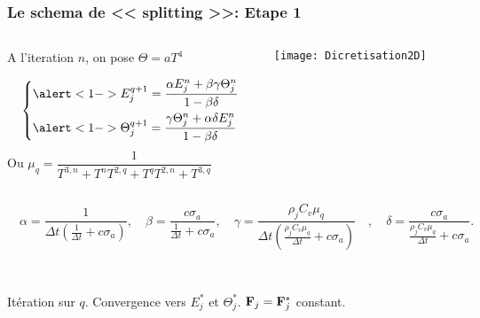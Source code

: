 \begin{frame}
  \frametitle{Le schema de << splitting >>: Etape 1}
  \begin{columns}
    \begin{column}{0.5\textwidth}
     A l'iteration $n$, on pose $\Theta = aT^4$

      \begingroup
      \normalsize
      \begin{equation*} 
        \begin{dcases}
         \alert<1->{E_j^{q+1} = \dfrac{\alpha E_j^n + \beta \gamma \Theta_j^n}{1 - \beta \delta}} \\
         \alert<1->{\Theta_j^{q+1} = \dfrac{\gamma \Theta_j^n + \alpha \delta E_j^n}{1 - \beta \delta}}
        \end{dcases}
    \label{eqn:Step1}
    \end{equation*}
      \endgroup
      Ou
      \tiny
      $\mu_q = \dfrac{1}{T^{3,n} + T^{n}T^{2,q} + T^{q}T^{2,n} + T^{3,q}}$
      \normalsize
    \end{column}
    \begin{column}{0.5\textwidth}
       \begin{center}
        \texttt{[image: Dicretisation2D]}       
       \end{center}
    \end{column}
   \end{columns}
   \tiny
  $\quad  \alpha = \dfrac{1}{\Delta t \left( \frac{1}{\Delta t} + c \sigma_a \right)} ,\quad 
   \beta = \dfrac{c \sigma_a}{\frac{1}{\Delta t} + c \sigma_a} ,\quad 
   \gamma = \dfrac{\rho_j C_v \mu_q}{\Delta t \left( \frac{\rho_j C_v \mu_q}{\Delta t} + c \sigma_a \right)} \quad , \quad  
   \delta = \dfrac{c \sigma_a}{\frac{\rho_j C_v \mu_q}{\Delta t} + c \sigma_a}.$

   \normalsize
   \begin{columns}
    \begin{column}{1.0\textwidth} 
      \\
      Itération sur $q$. Convergence vers $E_j^*$ et $\Theta_j^*$. $\mathbf{F}_j = \mathbf{F}_j^*$ constant.
    \end{column}
    \begin{column}{0.0\textwidth} 
    \end{column}
  \end{columns}
   
\end{frame}


